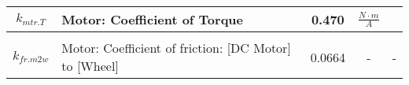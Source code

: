 \documentclass[crop=false,float=true,class=scrreprt]{standalone}
\begin{document}
\begin{table}[H]
\begin{tabular}{ | c | l | c | c | c |}
$k_{mtr.T}$     & Motor: Coefficient of Torque
                & 0.470
                & $\frac{N \cdot m}{A}$   
                & \cite{REF:conference:2015-howard}                                            \\[+0.0em] \hline && \\[-2.0em]
$k_{fr.m2w}$    & Motor: Coefficient of friction: [DC Motor] to [Wheel]
                & 0.0664
                & -
                & %
                  -                                                                            \\[+0.0em] \hline
\end{tabular}
\end{table}

\vspace*{\fill}



\clearpage
\end{document}
